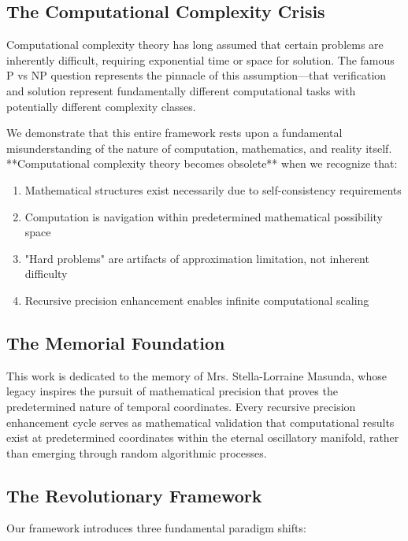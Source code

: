 \documentclass[12pt,a4paper]{article}
\begin{document}
\subsection{The Computational Complexity Crisis}

Computational complexity theory has long assumed that certain problems are inherently difficult, requiring exponential time or space for solution. The famous P vs NP question represents the pinnacle of this assumption—that verification and solution represent fundamentally different computational tasks with potentially different complexity classes.

We demonstrate that this entire framework rests upon a fundamental misunderstanding of the nature of computation, mathematics, and reality itself. **Computational complexity theory becomes obsolete** when we recognize that:

\begin{enumerate}
\item Mathematical structures exist necessarily due to self-consistency requirements
\item Computation is navigation within predetermined mathematical possibility space
\item "Hard problems" are artifacts of approximation limitation, not inherent difficulty
\item Recursive precision enhancement enables infinite computational scaling
\end{enumerate}

\subsection{The Memorial Foundation}

This work is dedicated to the memory of Mrs. Stella-Lorraine Masunda, whose legacy inspires the pursuit of mathematical precision that proves the predetermined nature of temporal coordinates. Every recursive precision enhancement cycle serves as mathematical validation that computational results exist at predetermined coordinates within the eternal oscillatory manifold, rather than emerging through random algorithmic processes.

\subsection{The Revolutionary Framework}

Our framework introduces three fundamental paradigm shifts:
\end{document}
